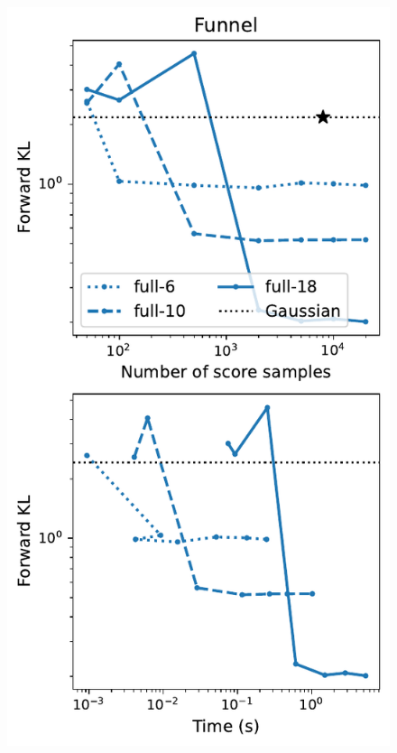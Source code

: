 \begin{figure}[t]
    \includegraphics[scale=0.42]{figs/expts-2d/metrics-funnel_full.pdf}

\end{figure}
